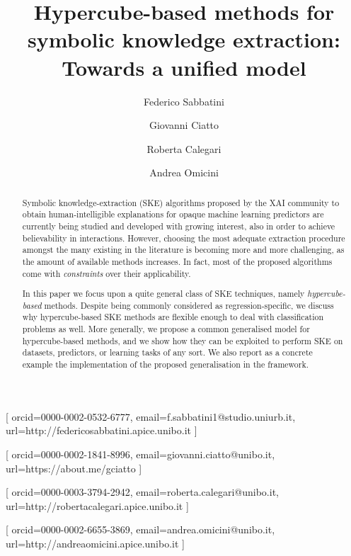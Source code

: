 \documentclass[
]{ceurart}
\begin{document}


\title{Hypercube-based methods for symbolic knowledge extraction: Towards a unified model}

\author[1]{Federico Sabbatini}[%
orcid=0000-0002-0532-6777,
email=f.sabbatini1@studio.uniurb.it,
url=http://federicosabbatini.apice.unibo.it
]\cormark[1]
\address[1]{Dipartimento di Scienze Pure e Applicate (DiSPeA), Universit\`a di Urbino, Italy}

\author[2]{Giovanni Ciatto}[%
orcid=0000-0002-1841-8996,
email=giovanni.ciatto@unibo.it,
url=https://about.me/gciatto
]
\address[2]{Dipartimento di Informatica -- Scienza e Ingegneria (DISI), \textsc{Alma Mater Studiorum}---Universit\`a di Bologna, Italy}

\author[3]{Roberta Calegari}[%
orcid=0000-0003-3794-2942,
email=roberta.calegari@unibo.it,
url=http://robertacalegari.apice.unibo.it
]
\address[3]{Alma Mater Research Institute for Human-Centered Artificial Intelligence, \textsc{Alma Mater Studiorum}---Universit\`a di Bologna, Italy}

\author[2]{Andrea Omicini}[%
orcid=0000-0002-6655-3869,
email=andrea.omicini@unibo.it,
url=http://andreaomicini.apice.unibo.it
]


\begin{abstract}
Symbolic knowledge-extraction (SKE) algorithms proposed by the XAI community to obtain human-intelligible explanations for opaque machine learning predictors are currently being studied and developed with growing interest, also in order to achieve believability in interactions.
%
However, choosing the most adequate extraction procedure amongst the many existing in the literature is becoming more and more challenging, as the amount of available methods increases.
%
In fact, most of the proposed algorithms come with \emph{constraints} over their applicability.

In this paper we focus upon a quite general class of SKE techniques, namely \emph{hypercube-based} methods.
%
Despite being commonly considered as regression-specific, we discuss why hypercube-based SKE methods are flexible enough to deal with classification problems as well.
%
More generally, we propose a common generalised model for hypercube-based methods, and we show how they can be exploited to perform SKE on datasets, predictors, or learning tasks of any sort.
%
%
We also report as a concrete example the implementation of the proposed generalisation in the \psyke{} framework.
\end{abstract}
\end{document}
